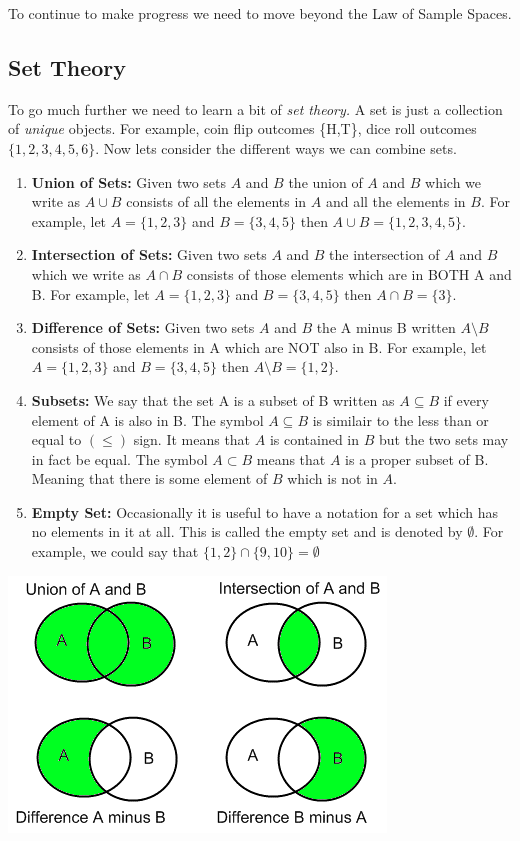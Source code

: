 \documentclass[
]{book}
\theoremstyle{definition}
\theoremstyle{definition}
\theoremstyle{definition}
\theoremstyle{definition}
\theoremstyle{remark}
\begin{document}
To continue to make progress we need to move beyond the Law of Sample Spaces.

\hypertarget{set-theory}{%
\subsection{Set Theory}\label{set-theory}}

To go much further we need to learn a bit of \emph{set theory.} A set is just a collection of \emph{unique} objects. For example, coin flip outcomes \{H,T\}, dice roll outcomes \(\{1,2,3,4,5,6\}\). Now lets consider the different ways we can combine sets.

\begin{enumerate}
\def\labelenumi{\arabic{enumi}.}
\item
  \textbf{Union of Sets:} Given two sets \(A\) and \(B\) the union of \(A\) and \(B\) which we write as \(A \cup B\) consists of all the elements in \(A\) and all the elements in \(B\). For example, let \(A=\{1,2,3\}\) and \(B=\{3,4,5\}\) then \(A \cup B=\{1,2,3,4,5\}\).
\item
  \textbf{Intersection of Sets:} Given two sets \(A\) and \(B\) the intersection of \(A\) and \(B\) which we write as \(A \cap B\) consists of those elements which are in BOTH A and B. For example, let \(A=\{1,2,3\}\) and \(B=\{3,4,5\}\) then \(A \cap B=\{3\}\).
\item
  \textbf{Difference of Sets:} Given two sets \(A\) and \(B\) the A minus B written \(A\setminus B\) consists of those elements in A which are NOT also in B. For example, let \(A=\{1,2,3\}\) and \(B=\{3,4,5\}\) then \(A \setminus B=\{1,2\}\).
\item
  \textbf{Subsets:} We say that the set A is a subset of B written as \(A \subseteq B\) if every element of A is also in B. The symbol \(A \subseteq B\) is similair to the less than or equal to \((\leq)\) sign. It means that \(A\) is contained in \(B\) but the two sets may in fact be equal. The symbol \(A \subset B\) means that \(A\) is a proper subset of B. Meaning that there is some element of \(B\) which is not in \(A\).
\item
  \textbf{Empty Set:} Occasionally it is useful to have a notation for a set which has no elements in it at all. This is called the empty set and is denoted by \(\emptyset\). For example, we could say that \(\{1,2\} \cap \{9,10\}=\emptyset\)
\end{enumerate}

\includegraphics{SetOperations.png}
\end{document}
